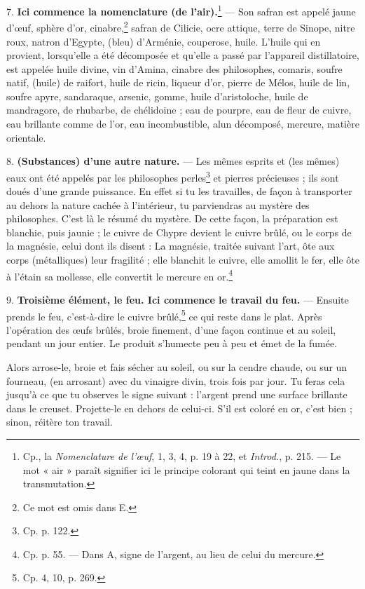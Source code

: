 \documentclass[a4paper, 11pt, oneside, polutonikogreek, french]{article}
\begin{document}
7. \textbf{Ici commence la nomenclature (de l'air).}\footnote{Cp., la \emph{Nomenclature de l'œuf}, 1, 3, 4, p. 19 à 22, et \emph{Introd.}, p. 215. --- Le mot « air » paraît signifier ici le principe colorant qui teint en jaune dans la transmutation.} --- Son safran est appelé jaune d'œuf, sphère d'or, cinabre,\footnote{Ce mot est omis dans E.} safran de Cilicie, ocre attique, terre de Sinope, nitre roux, natron d'Egypte, (bleu) d'Arménie, couperose, huile. L'huile qui en provient, lorsqu'elle a été décomposée et qu'elle a passé par l'appareil distillatoire, est appelée huile divine, vin d'Amina, cinabre des philosophes, comaris, soufre natif, (huile) de raifort, huile de ricin, liqueur d'or, pierre de Mélos, huile de lin, soufre apyre, sandaraque, arsenic, gomme, huile d'aristoloche, huile de mandragore, de rhubarbe, de chélidoine ; eau de pourpre, eau de fleur de cuivre, eau brillante comme de l'or, eau incombustible, alun décomposé, mercure, matière orientale.

8. \textbf{(Substances) d'une autre nature.} --- Les mêmes esprits et (les mêmes) eaux ont été appelés par les philosophes perles\footnote{Cp. p. 122.} et pierres précieuses ; ils sont doués d'une grande puissance. En effet si tu les travailles, de façon à transporter au dehors la nature cachée à l'intérieur, tu parviendras au mystère des philosophes. C'est là le résumé du mystère. De cette façon, la préparation est blanchie, puis jaunie ; le cuivre de Chypre devient le cuivre brûlé, ou le corps de la magnésie, celui dont ils disent : La magnésie, traitée suivant l'art, ôte aux corps (métalliques) leur fragilité ; elle blanchit le cuivre, elle amollit le fer, elle ôte à l'étain sa mollesse, elle convertit le mercure en or.\footnote{Cp. p. 55. --- Dans A, signe de l'argent, au lieu de celui du mercure.}

9. \textbf{Troisième élément, le feu. Ici commence le travail du feu.} --- Ensuite prends le feu, c'est-à-dire le cuivre brûlé,\footnote{Cp. 4, 10, p. 269.} ce qui reste dans le plat. Après l'opération des œufs brûlés, broie finement, d'une façon continue et au soleil, pendant un jour entier. Le produit s'humecte peu à peu et émet de la fumée.

Alors arrose-le, broie et fais sécher au soleil, ou sur la cendre chaude, ou sur un fourneau, (en arrosant) avec du vinaigre divin, trois fois par jour. Tu feras cela jusqu'à ce que tu observes le signe suivant : l'argent prend une surface brillante dans le creuset. Projette-le en dehors de celui-ci. S'il est coloré en or, c'est bien ; sinon, réitère ton travail.
\end{document}
